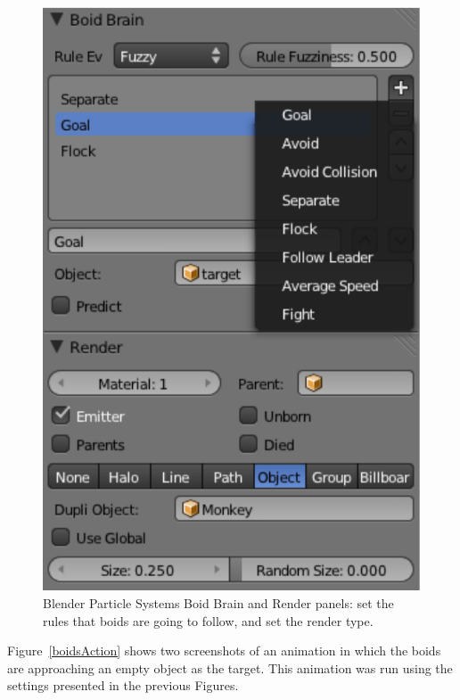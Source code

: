 \begin{figure}[htbp]
\begin{center}
\includegraphics[scale = 0.65]{figures/boidsBrain.pdf}
\caption{Blender Particle Systems Boid Brain and Render panels: set the rules that boids are going to follow, and set the render type.}
\label{boidsBrain}
\end{center}
\end{figure}

Figure~\ref{boidsAction} shows two screenshots of an animation in which the boids are approaching an empty object as the target. This animation was run using the settings presented in the previous Figures.

